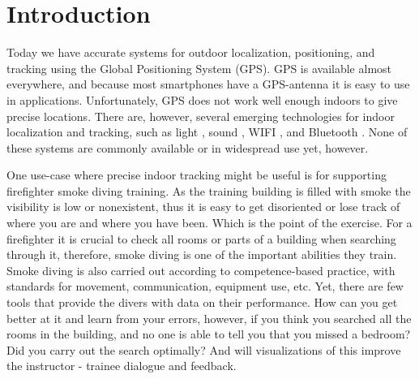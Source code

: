 \documentclass[../Main/thesis.tex]{subfiles}
\begin{document}
\chapter{Introduction}
\label{ch:introduction}


Today we have accurate systems for outdoor localization, positioning, and tracking using the Global Positioning System (GPS). 
GPS is available almost everywhere, and because most smartphones have a GPS-antenna it is easy to use in applications.
Unfortunately, GPS does not work well enough indoors to give precise locations.
There are, however, several emerging technologies for indoor localization and tracking, such as light \citep{xiaohan2010improved}, sound \citep{schweinzer2010ultrasonic}, WIFI  \citep{chang2010robust}, and Bluetooth \citep{Takahashi2016}.
None of these systems are commonly available or in widespread use yet, however.

One use-case where precise indoor tracking might be useful is for supporting firefighter smoke diving training. 
As the training building is filled with smoke the visibility is low or nonexistent, thus it is easy to get disoriented or lose track of where you are and where you have been.
Which is the point of the exercise.
For a firefighter it is crucial to check all rooms or parts of a building when searching through it, therefore, smoke diving is one of the important abilities they train.
Smoke diving is also carried out according to competence-based practice, with standards for movement, communication, equipment use, etc.
Yet, there are few tools that provide the divers with data on their performance.
How can you get better at it and learn from your errors, however, if you think you searched all the rooms in the building, and no one is able to tell you that you missed a bedroom?
Did you carry out the search optimally?
And will visualizations of this improve the instructor - trainee dialogue and feedback.
\end{document}
